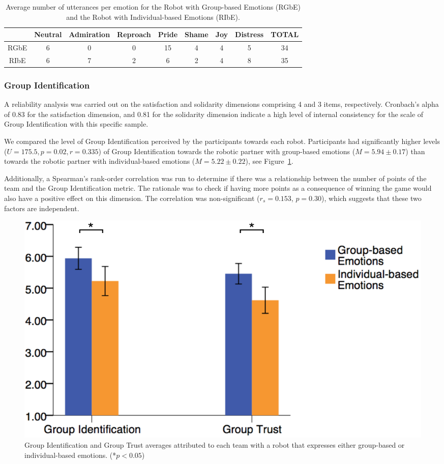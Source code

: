 \begin{table}[ht]
\centering
\caption{Average number of utterances per emotion for the Robot with Group-based Emotions (RGbE) and the Robot with Individual-based Emotions (RIbE).}
\label{tab:utterances-couning}
\begin{tabular}{c|ccccccc|c}
     & Neutral & Admiration & Reproach & Pride & Shame & Joy & Distress & \textbf{TOTAL} \\ \hline
RGbE & 6       & 0          & 0        & 15    & 4     & 4   & 5        & 34             \\
RIbE & 6       & 7          & 2        & 6     & 2     & 4   & 8        & 35            
\end{tabular}
\end{table}



\subsubsection{Group Identification}
A reliability analysis was carried out on the satisfaction and solidarity dimensions comprising 4 and 3 items, respectively. Cronbach's alpha of 0.83 for the satisfaction dimension, and 0.81 for the solidarity dimension indicate a high level of internal consistency for the scale of Group Identification with this specific sample.

We compared the level of Group Identification perceived by the participants towards each robot. Participants had significantly higher levels ($U=175.5, p=0.02, r=0.335$) of Group Identification towards the robotic partner with group-based emotions ($M=5.94\pm0.17$) than towards the robotic partner with individual-based emotions ($M=5.22\pm0.22$), see Figure~\ref{fig:group-measures}.

Additionally, a Spearman's rank-order correlation was run to determine if there was a relationship between the number of points of the team and the Group Identification metric. The rationale was to check if having more points as a consequence of winning the game would also have a positive effect on this dimension. The correlation was non-significant ($r_s=0.153$, $p=0.30$), which suggests that these two factors are independent. 



\begin{figure}[ht]
    \centering
    \includegraphics[width=0.6\columnwidth]{images/gbe/group2.png}
    \caption{Group Identification and Group Trust averages attributed to each team with a robot that expresses either group-based or individual-based emotions. (*$p<0.05$)}
    \label{fig:group-measures}
\end{figure}

